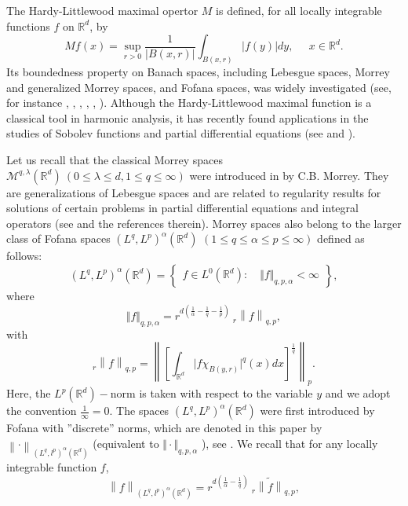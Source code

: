 \documentclass[a4paper,12pt,intlimits,oneside]{amsart}
\numberwithin{equation}{section}
\numberwithin{equation}{section}
\theoremstyle{definition}
\begin{document}
The Hardy-Littlewood maximal opertor $M$ is defined, for all locally integrable functions $f$ on $\mathbb{R}^{d}$, by
$$
 Mf(x)=\sup_{r>0}\frac{1}{\vert B(x,r)\vert}\int_{B(x,r)}\left|f(y)\right|dy,\;\;\;\;\; x\in \mathbb{R}^{d}.
$$
Its boundedness property on Banach spaces, including Lebesgue spaces, Morrey and generalized Morrey spaces, and Fofana spaces, was widely investigated (see, for instance \cite{CF}, \cite{GF},  \cite{JF}, \cite{Sa-Faz-Ha}, \cite{EN}, \cite{S}). Although the Hardy-Littlewood maximal function is a classical tool in harmonic analysis, it has recently found applications in the studies of Sobolev functions and partial differential equations (see \cite{BH} and \cite{L}).


Let us recall that the classical Morrey spaces $ \mathcal{M}^{q, \lambda}(\mathbb{R}^{d}) \: (0\leq \lambda \leq d, 1\leq q \leq \infty)$ were introduced in \cite{Mo} by C.B. Morrey. They are generalizations of Lebesgue spaces and are related to regularity results for solutions of certain problems in partial differential equations and integral operators (see \cite{Sa-Faz-Ha} and the references therein). Morrey spaces also belong to the larger class of Fofana spaces $\left(L^{q},L^{p}\right)^{\alpha}(\mathbb{R}^d)$ $ (1 \leq q \leq \alpha \leq p \leq \infty) $ defined as follows:
$$(L^{q},L^{p})^{\alpha}(\mathbb{R}^{d})= \left\{
      \begin{array}{ll}
      f \in L^{0}(\mathbb{R}^{d}) : \quad  \Vert f \Vert_{q,p, \alpha } < \infty
      \end{array}
      \right\},$$
 where
 $$ \Vert f \Vert_{q,p, \alpha }= r^{d(\frac{1}{\alpha}-\frac{1}{q}-\frac{1}{p})}\:_{r}\left\|f\right\|_{q,p},$$
 with 
\begin{equation}
 _{r}\left\|f\right\|_{q,p} = \left\|\left[\int_{\mathbb R^{d}}\vert f\chi_{B(y,r)}\vert^{q}(x)dx\right]^{\frac{1}{q}}\right\|_p . \label{M}
 \end{equation} 
Here, the $ L^{p}(\mathbb{R}^{d})-$norm is taken with respect to the variable $ y$ and we adopt the convention $\frac{1}{\infty} =0$. The spaces $\left(L^{q},L^{p}\right)^{\alpha}(\mathbb{R}^d)$ were first introduced by Fofana with ''discrete'' norms, which are denoted in this paper by $ \left\|\cdot\right\|_{(L^{q},l^{p})^{\alpha}(\mathbb{R}^{d})} $ (equivalent to $ \Vert \cdot \Vert_{q,p, \alpha}$ ), see \cite{IF1}. We recall that for any locally integrable function $f$,  
 $$\left\| f \right\|_{(L^{q},l^{p})^{\alpha}(\mathbb{R}^{d})} = r^{d(\frac{1}{\alpha}-\frac{1}{q})}\:_{r}\widetilde{\left\|f\right\|}_{q,p},$$
\end{document}
